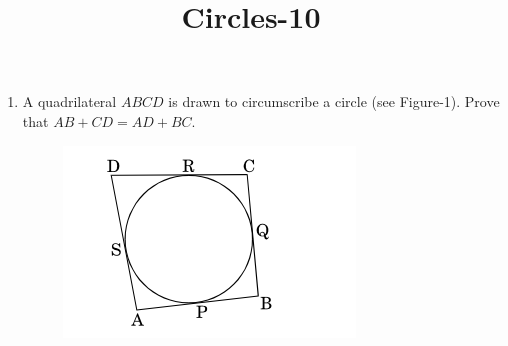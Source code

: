 \documentclass{article}
\begin{document}
\title{Circles-10}
\begin{enumerate}
	\item A quadrilateral $ABCD$ is drawn to circumscribe a circle (see Figure-1). Prove that $AB + CD = AD + BC$.
	\begin{figure}[!htb]
		\centering
			\includegraphics[width=\columnwidth]{figs/circ-1.png}
		

\end{figure}
\end{enumerate}
\end{document}
